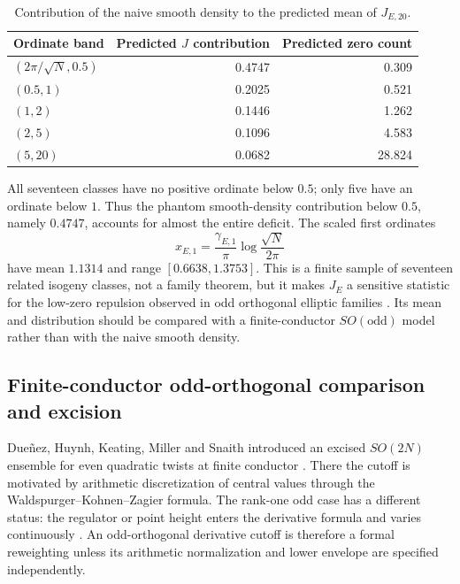 \documentclass[11pt,reqno]{amsart}
\theoremstyle{remark}
\begin{document}
\begin{table}[H]
\centering
\small
\caption{Contribution of the naive smooth density to the predicted mean of $J_{E,20}$.}
\label{tab:density-bands}
\begin{tabular}{@{}lrr@{}}
\toprule
Ordinate band & Predicted $J$ contribution & Predicted zero count\\
\midrule
$(2\pi/\sqrt N,0.5)$ & 0.4747 & 0.309\\
$(0.5,1)$              & 0.2025 & 0.521\\
$(1,2)$                & 0.1446 & 1.262\\
$(2,5)$                & 0.1096 & 4.583\\
$(5,20)$               & 0.0682 & 28.824\\
\bottomrule
\end{tabular}
\end{table}

All seventeen classes have no positive ordinate below $0.5$; only five have an ordinate below $1$.  Thus the phantom smooth-density contribution below $0.5$, namely $0.4747$, accounts for almost the entire deficit.  The scaled first ordinates
\begin{equation}
  x_{E,1}=\frac{\gamma_{E,1}}{\pi}
  \log\frac{\sqrt N}{2\pi}
\end{equation}
have mean $1.1314$ and range $[0.6638,1.3753]$.  This is a finite sample of seventeen related isogeny classes, not a family theorem, but it makes $J_E$ a sensitive statistic for the low-zero repulsion observed in odd orthogonal elliptic families \cite{Miller2006,Marshall2013}.  Its mean and distribution should be compared with a finite-conductor $SO(\mathrm{odd})$ model rather than with the naive smooth density.


\subsection{Finite-conductor odd-orthogonal comparison and excision}
\label{sec:dhkms-tests}

Due\~nez, Huynh, Keating, Miller and Snaith introduced an excised $SO(2N)$ ensemble for even quadratic twists at finite conductor \cite{DHKMS2012}.  There the cutoff is motivated by arithmetic discretization of central values through the Waldspurger--Kohnen--Zagier formula.  The rank-one odd case has a different status: the regulator or point height enters the derivative formula and varies continuously \cite{CRSW2007}.  An odd-orthogonal derivative cutoff is therefore a formal reweighting unless its arithmetic normalization and lower envelope are specified independently.
\end{document}
